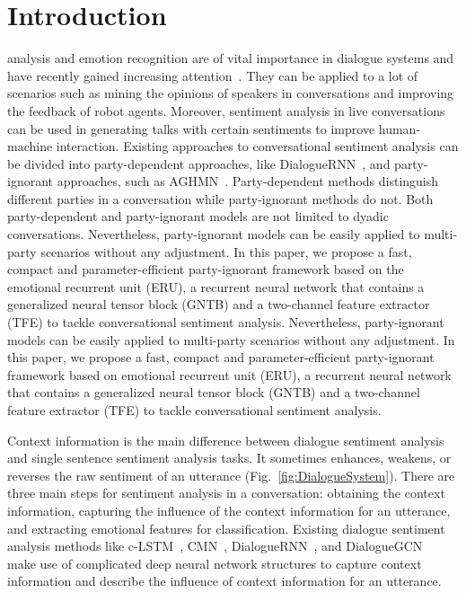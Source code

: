 \documentclass[journal]{IEEEtran}
\begin{document}
\section{Introduction}
\label{sec:intro}
 analysis and emotion recognition are of vital importance in dialogue systems and have recently gained increasing attention~\cite{maasur}. They can be applied to a lot of scenarios such as mining the opinions of speakers in conversations and improving the feedback of robot agents. Moreover, sentiment analysis in live conversations can be used in generating talks with certain sentiments to improve human-machine interaction. Existing approaches to conversational sentiment analysis can be divided into party-dependent approaches, like DialogueRNN~\cite{majumder2019dialoguernn}, and party-ignorant approaches, such as AGHMN~\cite{jiao2019real}. Party-dependent methods distinguish different parties in a conversation while party-ignorant methods do not.  Both party-dependent and party-ignorant models are not limited to dyadic conversations. Nevertheless, party-ignorant models can be easily applied to multi-party scenarios without any adjustment. In this paper, we propose a fast, compact and parameter-efficient party-ignorant framework based on the emotional recurrent unit (ERU), a recurrent neural network that contains a generalized neural tensor block (GNTB) and a two-channel feature extractor (TFE) to tackle conversational sentiment analysis. 
Nevertheless, party-ignorant models can be easily applied to multi-party scenarios without any adjustment. In this paper, we propose a fast, compact and parameter-efficient party-ignorant framework based on emotional recurrent unit (ERU), a recurrent neural network that contains a generalized neural tensor block (GNTB) and a two-channel feature extractor (TFE) to tackle conversational sentiment analysis.

Context information is the main difference between dialogue sentiment analysis and single sentence sentiment analysis tasks. It sometimes enhances, weakens, or reverses the raw sentiment of an utterance (Fig.~\ref{fig:DialogueSystem}). There are three main steps for sentiment analysis in a conversation: obtaining the context information, capturing the influence of the context information for an utterance, and extracting emotional features for classification. Existing dialogue sentiment analysis methods like c-LSTM~\cite{poria2017context}, CMN~\cite{hazarika2018conversational}, DialogueRNN~\cite{majumder2019dialoguernn}, and DialogueGCN~\cite{ghosal2019dialoguegcn} make use of complicated deep neural network structures to capture context information and describe the influence of context information for an utterance.
\end{document}
